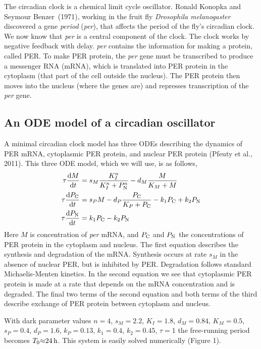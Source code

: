 \documentclass[10pt,letter, swedish, english,%
]{article}
\begin{document}
The circadian clock is a chemical limit cycle oscillator. Ronald
Konopka and Seymour Benzer~(1971), working in the fruit fly
\textit{Drosophila melanogaster} discovered a gene \textit{period}
(\textit{per}), that affects the period of the fly's circadian clock.
We now know that \textit{per} is a central component of the clock.
The clock works by negative feedback with delay. \textit{per}
contains the information for making a protein, called PER. To make
PER protein, the \textit{per} gene must be transcribed to produce a
messenger RNA (mRNA), which is translated into PER protein in the
cytoplasm (that part of the cell outside the nucleus). The PER
protein then moves into the nucleus (where the genes are) and
represses transcription of the \textit{per} gene. 

\subsection{An ODE model of a circadian oscillator}
A minimal circadian clock model has three ODEs describing the dynamics
of PER mRNA, cytoplasmic PER protein, and nuclear PER protein (Pfeuty
et al., 2011). This three ODE model, which we will use, is as
follows,
\begin{equation}\label{eq:Pfeutysystem}
\begin{aligned}
\tau\dv{M}{t}&={s}_{M}\frac{{K}_{I}^{n}}{{K}_{I}^{n}+P_{\text{N}}^{n}}-{d}_{M}\frac{M}{{K}_{M}+M}\\
\tau\dv{P_{\text{C}}}{t}&={s}_{P}M-{d}_{P}\frac{P_{\text{C}}}{{K}_{P}+P_{\text{C}}}-{k}_{1}P_{\text{C}}+{k}_{2}P_{\text{N}}\\
\tau \dv{P_{\text{N}}}{t}&={k}_{1}P_{\text{C}}-{k}_{2}P_{\text{N}}
\end{aligned}
\end{equation}
Here  $M$ is concentration of \textit{per} mRNA, and  $P_{\text{C}}$ and 
$P_{\text{N}}$ the concentrations of PER protein in the cytoplasm and
nucleus. The first equation describes the synthesis and degradation
of the mRNA. Synthesis occurs at rate  ${s}_{M}$ in the absence of
nuclear PER, but is inhibited by PER. Degradation follows standard
Michaelis-Menten kinetics. In the second equation we see that
cytoplasmic PER protein is made at a rate that depends on the mRNA
concentration and is degraded. The final two terms of the second
equation and both terms of the third describe exchange of PER protein
between cytoplasm and nucleus. 

With dark parameter values  $n=4$,  ${s}_{M}=2.2$,  ${K}_{I}=1.8$, 
${d}_{M}=0.84$,  ${K}_{M}=0.5$,  ${s}_{P}=0.4$,  ${d}_{P}=1.6$, 
${k}_{P}=0.13$,  ${k}_{1}=0.4$,  ${k}_{2}=0.45$,  $\tau =1$ the
free-running period becomes  ${T}_{0}{\approx}\unit[24]{h}$. This system is
easily solved numerically (Figure 1). 
\end{document}
